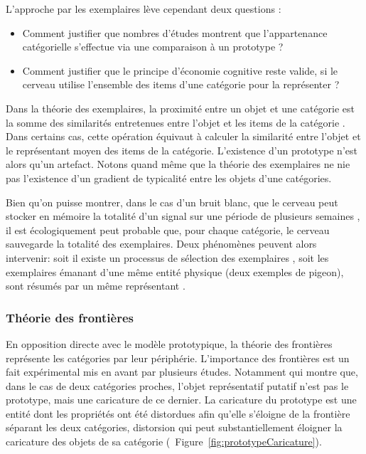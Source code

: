 L'approche par les exemplaires lève cependant deux questions \citep{goldstone2003concepts}:

\begin{itemize}
\item Comment justifier que nombres d'études montrent que l'appartenance catégorielle s'effectue via une comparaison à un prototype ?
\item Comment justifier que le principe d'économie cognitive reste valide, si le cerveau utilise l'ensemble des items d'une catégorie pour la représenter ? 
\end{itemize}

Dans la théorie des exemplaires, la proximité entre un objet et une catégorie est la somme des similarités entretenues entre l'objet et les items de la catégorie \citep{nosofsky1986attention}. Dans certains cas, cette opération équivaut à calculer la similarité entre l'objet et le représentant moyen des items de la catégorie. L’existence d'un prototype n'est alors qu'un artefact. Notons quand même que la théorie des exemplaires ne nie pas l'existence d'un gradient de typicalité entre les objets d'une catégories.

Bien qu'on puisse montrer, dans le cas d'un bruit blanc, que le cerveau peut stocker en mémoire la totalité d'un signal sur une période de plusieurs semaines  \citep{agus2010rapid}, il est écologiquement peut probable que, pour chaque catégorie, le cerveau sauvegarde la totalité des exemplaires. Deux phénomènes peuvent alors intervenir: soit il existe un processus de sélection des exemplaires \citep{palmeri1995recognition}, soit les exemplaires émanant d'une même entité physique (deux exemples de pigeon), sont résumés par un même représentant \citep{barsalou1998basing} .

\subsubsection{Théorie des frontières}

En opposition directe avec le modèle prototypique, la théorie des frontières représente les catégories par leur périphérie. L'importance des frontières est un fait expérimental mis en avant par plusieurs études. Notamment \citep{davis2010memory} qui montre que, dans le cas de deux catégories proches, l'objet représentatif putatif n'est pas le prototype, mais une caricature de ce dernier. La caricature du prototype est une entité dont les propriétés ont été distordues afin qu'elle s'éloigne de la frontière séparant les deux catégories, distorsion qui peut substantiellement éloigner la caricature des objets de sa catégorie (\cf~Figure~\ref{fig:prototypeCaricature}).

